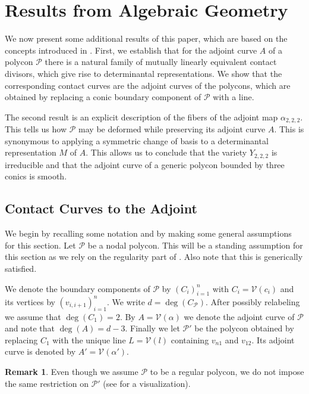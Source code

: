 \documentclass[a4paper,10pt]{amsart}
\theoremstyle{definition}
\newtheorem{rem}[defin]{Remark}
\theoremstyle{plain}
\newcommand{\cP}{{\mathcal P}}
\newcommand{\cV}{{\mathcal V}}
\begin{document}
\section{Results from Algebraic Geometry} \label{sec:mainResult}

We now present some additional results of this paper, which are based on the concepts introduced in . First, we establish that for the adjoint curve $A$ of a polycon $\cP$ there is a natural family of mutually linearly equivalent contact divisors, which give rise to determinantal representations. We show that the corresponding contact curves are the adjoint curves of the polycons, which are obtained by replacing a conic boundary component of $\cP$ with a line.

The second result is an explicit description of the fibers of the adjoint map $\alpha_{2,2,2}$. This tells us how $\cP$ may be deformed while preserving its adjoint curve $A$. This is synonymous to applying a symmetric change of basis to a determinantal representation $M$ of $A$. This allows us to conclude that the variety $Y_{2,2,2}$ is irreducible and that the adjoint curve of a generic polycon bounded by three conics is smooth.


\subsection{Contact Curves to the Adjoint} \label{sec:contactResults}

We begin by recalling some notation and by making some general assumptions for this section. Let $\cP$ be a nodal polycon. This will be a standing assumption for this section as we rely on the regularity part of . Also note that this is generically satisfied.

We denote the boundary components of $\cP$ by $(C_i)_{i=1}^n$ with $C_i = \cV(c_i)$ and its vertices by $(v_{i,i+1})_{i=1}^n$. We write $d = \deg(C_\cP)$. After possibly relabeling we assume that $\deg(C_1) = 2$. By $A = \cV(\alpha)$ we denote the adjoint curve of $\cP$ and note that $\deg(A) = d-3$. Finally we let $\cP'$ be the polycon obtained by replacing $C_1$ with the unique line $L = \cV(l)$ containing $v_{n1}$ and $v_{12}$. Its adjoint curve is denoted by $A' = \cV(\alpha')$.

\begin{rem}
 Even though we assume $\cP$ to be a regular polycon, we do not impose the same restriction on $\cP'$ (see  for a visualization).
\end{rem}
\end{document}
